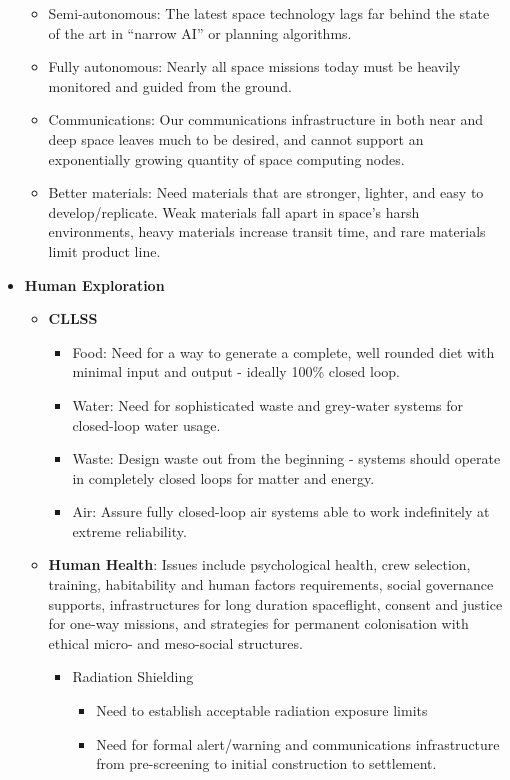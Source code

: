 \documentclass[letter,11pt]{article}
\begin{document}
\begin{itemize}
\begin{itemize}
			\item Semi-autonomous: The latest space technology lags far behind the state of the art in ``narrow AI'' or planning algorithms.
			\item Fully autonomous: Nearly all space missions today must be heavily monitored and guided from the ground.
			\item Communications: Our communications infrastructure in both near and deep space leaves much to be desired, and cannot support an exponentially growing quantity of space computing nodes.
			\item Better materials: Need materials that are stronger, lighter, and easy to develop/replicate. Weak materials fall apart in space's harsh environments, heavy materials increase transit time, and rare materials limit product line.
		\end{itemize}
	\item \textbf{Human Exploration} \begin{itemize}
			\item \textbf{\gls{CLLSS}} \begin{itemize}
					\item Food: Need for a way to generate a complete, well rounded diet with minimal input and output - ideally 100\% closed loop.
					\item Water: Need for sophisticated waste and grey-water systems for closed-loop water usage.
					\item Waste: Design waste out from the beginning - systems should operate in completely closed loops for matter and energy.
					\item Air: Assure fully closed-loop air systems able to work indefinitely at extreme reliability.
				\end{itemize}
			\item \textbf{Human Health}: Issues include psychological health, crew selection, training, habitability and human factors requirements, social governance supports, infrastructures for long duration spaceflight, consent and justice for one-way missions, and strategies for permanent colonisation with ethical micro- and meso-social structures. \begin{itemize}
					\item Radiation Shielding \begin{itemize}
							\item Need to establish acceptable radiation exposure limits
							\item Need for formal alert/warning and communications infrastructure from pre-screening to initial construction to settlement.

\end{itemize}
\end{itemize}
\end{itemize}
\end{itemize}
\end{document}

